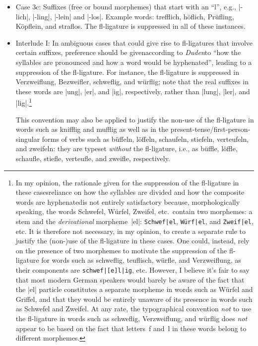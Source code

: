 \documentclass[11pt]{article}
\begin{document}
\begin{itemize}
\begin{itemize}
\item Case 3c: Suffixes (free or bound morphemes) that start with an \enquote{l}, e.g., |-lich|, |-ling|, |-lein| and |-los|. Example words: trefflich, höflich, Prüfling, Köpflein, and s\breaklig traflos. The fl-ligature is suppressed in all of these instances. 

\item Interlude I: In ambiguous cases that could give rise to fl-ligatures that involve certain suffixes, preference should be given\textemdash according to  \emph{Duden}\textemdash to \enquote{how the syllables are pronounced and how a word would be hyphenated}, leading to a suppression of the fl-ligature. For instance, the fl-ligature is suppressed in Verzweif\-lung, Bezweifler, schweflig, and würflig; note that the real suffixes in these words are |ung|, |er|, and |ig|, respectively, rather than |lung|, |ler|, and |lig|.\footnote{%
In my opinion, the rationale given for the suppression of the fl-ligature in these cases\textemdash reliance on how the syllables are divided and how the composite words are hyphenated\textemdash is not entirely satisfactory because, morphologically speaking, the words Schwefel, Würfel, Zweifel, etc.\ contain two morphemes: a stem and the \emph{derivational} morpheme~|el|: \Verb+Schwef|el+, \Verb+Würf|el+, and \Verb+Zweif|el+, etc. It is therefore not necessary, in my opinion, to create a separate rule to justify the (non-)use of the fl-ligature in these cases. One could, instead, rely on the presence of two morphemes to motivate the suppression of the fl-ligature for words such as schweflig, teuflisch, würfle, and Verzweiflung, as their components are \Verb+schwef|[e]l|ig+, etc. However, I believe it's fair to say that most modern German speakers would barely be aware of the fact that the |el| particle constitutes a separate morpheme in words such as Würfel and Griffel, and that they would be entirely unaware of its presence in words such as Schwefel and Zweifel. At any rate, the typographical convention \emph{not} to use the fl-ligature in words such as schweflig, Verzweiflung, and würflig does \emph{not} appear to be based on the fact that letters~f and~l in these words belong to different morphemes.}

This convention may also be applied to justify the non-use of the fl-ligature in words such as knifflig and mufflig as well as in the present-tense/first-person-singular forms of verbs such as büffeln, löffeln, schaufeln, stiefeln, verteufeln, and zweifeln: they are typeset \emph{without} the fl-ligature, i.e., as büffle, löffle, schaufle, stiefle, verteufle, and zweifle, respectively.


\end{itemize}
\end{itemize}
\end{document}
